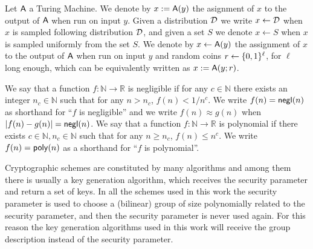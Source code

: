 Let $\mathsf{A}$ a Turing Machine. We denote by $x:=\mathsf{A}(y)$ the asignment of $x$ to the output of $\mathsf{A}$ when run on input $y$. Given a distribution $\mathcal{D}$ we write $x\gets\mathcal{D}$ when $x$ is sampled following distribution $\mathcal{D}$, and given a set $S$ we denote $x\gets S$ when $x$ is sampled uniformly from the set $S$. We denote by $x\gets\mathsf{A}(y)$ the assignment of $x$ to the output of $\mathsf{A}$ when run on input $y$ and random coins $r\gets\{0,1\}^\ell$, for $\ell$ long enough, which can be equivalently written as $x:=\mathsf{A}(y;r)$. 

We say that a function $f:\mathbb{N}\to\mathbb{R}$ is negligible if for any $c\in\mathbb{N}$ there exists an integer $n_c\in\mathbb{N}$ such that for any $n> n_c$, $f(n)<1/n^c$. We write $f(n)=\mathsf{negl}(n)$ as shorthand for ``$f$ is negligible'' and we write $f(n)\approx g(n)$ when $|f(n)-g(n)|=\mathsf{negl}(n)$. We say that a function $f:\mathbb{N}\to\mathbb{R}$ is polynomial if there exists $c\in\mathbb{N},n_c\in\mathbb{N}$ such that for any $n\geq n_c$, $f(n)\leq n^c$. We write $f(n)=\mathsf{poly}(n)$ as a shorthand for ``$f$ is polynomial''.

Cryptographic schemes are constituted by many algorithms and among them there is usually a key generation algorithm, which receives the security parameter and return a set of keys. In all the schemes used in this work the security parameter is used to choose a (bilinear) group of size polynomially related to the security parameter, and then the security parameter is never used again. For this reason the key generation algorithms used in this work will receive the group description instead of the security parameter.
